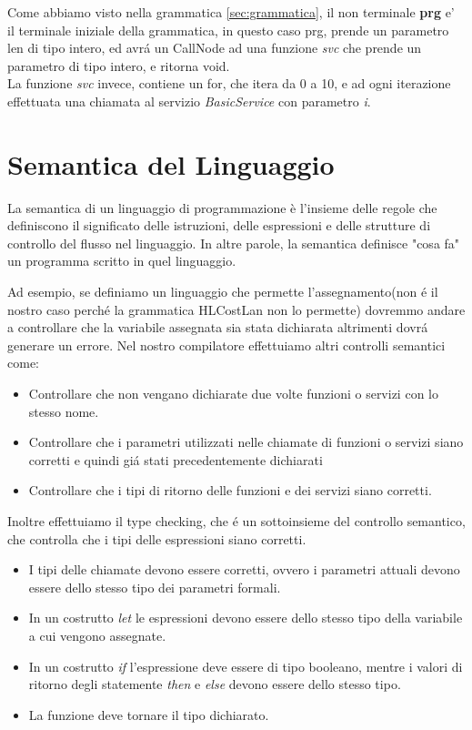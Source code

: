 \documentclass[../../main.tex]{subfiles}
\begin{document}
Come abbiamo visto nella grammatica \ref{sec:grammatica}, il non terminale \textbf{prg} e' il terminale iniziale della grammatica, in questo caso prg, prende un parametro len di tipo intero, ed avrá un CallNode ad una funzione \textit{svc} che prende un parametro di tipo intero, e ritorna void.\\
La funzione \textit{svc} invece, contiene un for, che itera da 0 a 10, e ad ogni iterazione effettuata una chiamata al servizio \textit{BasicService} con parametro \textit{i}.\\
\section{Semantica del Linguaggio}\label{sec:semantica}
La semantica di un linguaggio di programmazione è l'insieme delle regole che definiscono il significato delle istruzioni, delle espressioni e delle strutture di controllo del flusso nel linguaggio. In altre parole, la semantica definisce "cosa fa" un programma scritto in quel linguaggio.

Ad esempio, se definiamo un linguaggio che permette l'assegnamento(non é il nostro caso perché la grammatica HLCostLan non lo permette) dovremmo andare a controllare che la variabile assegnata sia stata dichiarata altrimenti dovrá generare un errore.
Nel nostro compilatore effettuiamo altri controlli semantici come:
\begin{itemize}
    \item Controllare che non vengano dichiarate due volte funzioni o servizi con lo stesso nome.
    \item Controllare che i parametri utilizzati nelle chiamate di funzioni o servizi siano corretti e quindi giá stati precedentemente dichiarati
    \item Controllare che i tipi di ritorno delle funzioni e dei servizi siano corretti.
\end{itemize}
Inoltre effettuiamo il type checking, che é un sottoinsieme del controllo semantico, che controlla che i tipi delle espressioni siano corretti.\\
\begin{itemize}
    \item I tipi delle chiamate devono essere corretti, ovvero i parametri attuali devono essere dello stesso tipo dei parametri formali.
    \item In un costrutto \textit{let} le espressioni devono essere dello stesso tipo della variabile a cui vengono assegnate.
    \item In un costrutto \textit{if} l'espressione deve essere di tipo booleano, mentre i valori di ritorno degli statemente \textit{then} e \textit{else} devono essere dello stesso tipo.
    \item La funzione deve tornare il tipo dichiarato.
\end{itemize}
\end{document}

